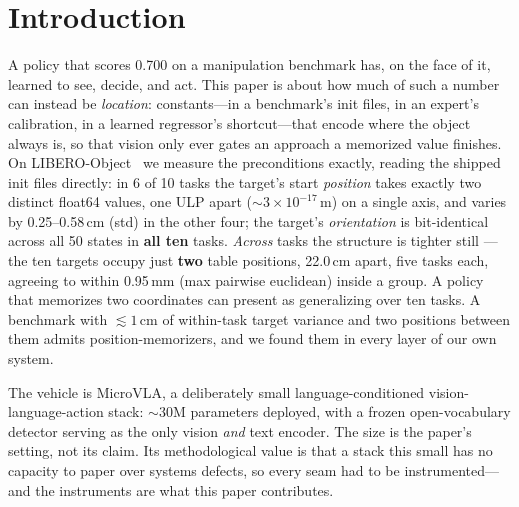 \documentclass[10pt,twocolumn,letterpaper]{article}
\begin{document}
\section{Introduction}

A policy that scores 0.700 on a manipulation benchmark has, on the face of it,
learned to see, decide, and act. This paper is about how much of such a number
can instead be \emph{location}: constants---in a benchmark's init files, in an
expert's calibration, in a learned regressor's shortcut---that encode where the
object always is, so that vision only ever gates an approach a memorized value
finishes. On LIBERO-Object~\citep{liu2023libero} we measure the preconditions
exactly, reading the shipped init files directly: in 6 of 10 tasks the target's
start \emph{position} takes exactly two distinct float64 values, one ULP apart
(${\sim}3\times10^{-17}$\,m) on a single axis, and varies by 0.25--0.58\,cm
(std) in the other four; the target's \emph{orientation} is bit-identical
across all 50 states in \textbf{all ten} tasks. \emph{Across} tasks the
structure is tighter still --- the ten targets occupy just \textbf{two} table
positions, 22.0\,cm apart, five tasks each, agreeing to within 0.95\,mm (max
pairwise euclidean) inside a group. A policy that memorizes two
coordinates can present as generalizing over ten tasks. A benchmark with
${\lesssim}1$\,cm of within-task target variance and two positions between them
admits position-memorizers, and we found them in every layer of our own system.

The vehicle is MicroVLA, a deliberately small language-conditioned
vision-language-action stack: ${\sim}30$M parameters deployed, with a frozen
open-vocabulary detector serving as the only vision \emph{and} text encoder.
The size is the paper's setting, not its claim. Its methodological value is
that a stack this small has no capacity to paper over systems defects, so every
seam had to be instrumented---and the instruments are what this paper
contributes.
\end{document}
